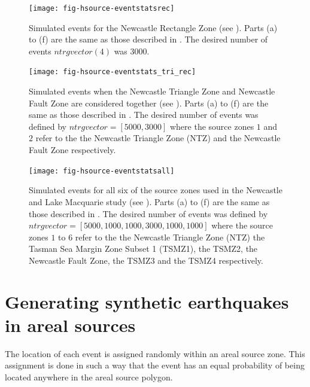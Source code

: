 \begin{figure}
\begin{center}
\texttt{[image: fig-hsource-eventstatsrec]}
\end{center}
\caption{Simulated events for the Newcastle Rectangle Zone (see
\citealt{dr_Dhu02b}). Parts (a) to (f) are the same as those
described in . The desired
number of events $ntrgvector(4)$ was $3000$.}
\label{fig:source-catalogue-results2}
\end{figure}

\begin{figure}
\begin{center}
\texttt{[image: fig-hsource-eventstats\_tri\_rec]}
\end{center}
 \caption{Simulated
events when the Newcastle Triangle Zone and Newcastle Fault Zone
are considered together (see \citealt{dr_Dhu02b}). Parts (a) to
(f) are the same as those described in
. The desired number of events
was defined by $ntrgvector = [5000,3000]$ where the source zones
$1$ and $2$ refer to the the Newcastle Triangle Zone (NTZ) and the
Newcastle Fault Zone respectively.}
\label{fig:source-catalogue-results3}
\end{figure}



\begin{figure}
\begin{center}
\texttt{[image: fig-hsource-eventstatsall]}
\end{center}
\caption{Simulated events for all six of the source zones used in
the Newcastle and Lake Macquarie study (see \citealt{dr_Dhu02b}).
Parts (a) to (f) are the same as those described in
. The desired number of events
was defined by $ntrgvector = [5000,1000,1000,3000,1000,1000]$
where the source zones $1$ to $6$ refer to the the Newcastle
Triangle Zone (NTZ) the Tasman Sea Margin Zone Subset 1 (TSMZ1),
the TSMZ2, the Newcastle Fault Zone, the TSMZ3 and the TSMZ4
respectively.} \label{fig:source-catalogue-results4}
\end{figure}



\section{Generating synthetic earthquakes in areal sources}
\label{sec:areal_gen}

The location of each event is assigned randomly within an areal source zone. 
This assignment is done in such a way that the event has
an equal probability of being located anywhere in the areal source
polygon. 



